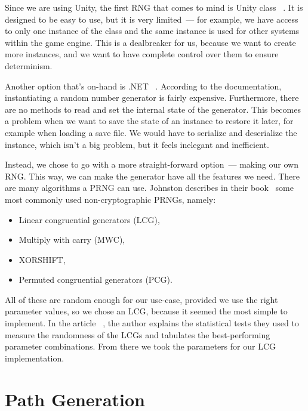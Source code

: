Since we are using Unity, the first RNG that comes to mind is Unity class ~\cite{UnityRandom}.
It is designed to be easy to use, but it is very limited~--- for example, we have access to only one instance of the class and the same instance is used for other systems within the game engine.
This is a dealbreaker for us, because we want to create more instances, and we want to have complete control over them to ensure determinism.

Another option that's on-hand is .NET ~\cite{SystemRandom}.
According to the documentation, instantiating a random number generator is fairly expensive.
Furthermore, there are no methods to read and set the internal state of the generator.
This becomes a problem when we want to save the state of an instance to restore it later, for example when loading a save file.
We would have to serialize and deserialize the instance, which isn't a big problem, but it feels inelegant and inefficient.

Instead, we chose to go with a more straight-forward option~--- making our own RNG.
This way, we can make the generator have all the features we need.
There are many algorithms a PRNG can use.
Johnston describes in their book~\cite{johnston2018random} some most commonly used non-cryptographic PRNGs, namely:
\begin{itemize}
    \item Linear congruential generators (LCG),
    \item Multiply with carry (MWC),
    \item XORSHIFT,
    \item Permuted congruential generators (PCG).
\end{itemize}
All of these are random enough for our use-case, provided we use the right parameter values, so we chose an LCG, because it seemed the most simple to implement.
In the article ~\cite{LCGTables}, the author explains the statistical tests they used to measure the randomness of the LCGs and tabulates the best-performing parameter combinations.
From there we took the parameters for our LCG implementation.

\section{Path Generation}\label{sec:analysis-path-generation}

